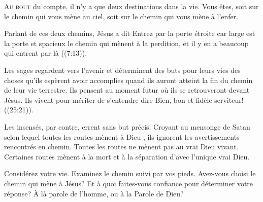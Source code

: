 
\lettrine{A}{u bout} du compte, il n'y a que deux destinations dans la vie.
 Vous êtes, soit sur le chemin qui vous mène au ciel,
 soit sur le chemin qui vous mène à l'enfer.

Parlant de ces deux chemins, Jésus a dit\frcolon{} 
 \Og Entrez par la porte étroite car large est la porte et spacieux le chemin
 qui mènent à la perdition,
 et il y en a beaucoup qui entrent par là \Fg{}
 ((7:13)).


Les sages regardent vers l'avenir et déterminent des buts pour leurs vies
 \ocadr des choses qu'ils espèrent avoir accomplies quand ils auront atteint
 la fin du chemin de leur vie terrestre.
 Ils pensent au moment futur où ils se retrouveront devant Jésus.
 Ils vivent pour mériter de s'entendre dire\frcolon{} 
 \Og Bien, bon et fidèle serviteur! \Fg{} ((25:21)).

Les insensés, par contre, errent sans but précis.
 Croyant au mensonge de Satan selon lequel
 \Og toutes les routes mènent à Dieu \Fg{},
 ils ignorent les avertissements rencontrés en chemin.
 Toutes les routes ne mènent pas au vrai Dieu vivant.
 Certaines routes mènent à la mort
 \ocadr et à la séparation d'avec l'unique vrai Dieu.

Considérez votre vie. Examinez le chemin suivi par vos pieds.
 Avez-vous choisi le chemin qui mène à Jésus?
 Et à quoi faites-vous confiance pour déterminer votre réponse?
 À là parole de l'homme, ou à la Parole de Dieu?

\dvrule







